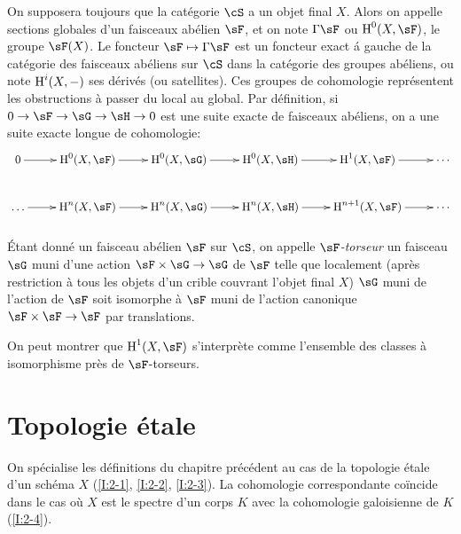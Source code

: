 On supposera toujours que la catégorie $\cS$ a un objet final $X$. Alors on 
appelle sections globales d'un faisceaux abélien $\sF$, et on note 
$\Gamma\sF$ ou $\h^0(X,\sF)$, le groupe $\sF(X)$. Le foncteur 
$\sF\mapsto\Gamma\sF$ est un foncteur exact \'a gauche de la catégorie des 
faisceaux abéliens sur $\cS$ dans la catégorie des groupes abéliens, ou 
note $\operatorname{H}^i(X,-)$ ses dérivés (ou satellites). Ces groupes de cohomologie 
représentent les obstructions à passer du local au global. Par définition, si 
$0\to\sF\to\sG\to\sH\to 0$ est une suite exacte de faisceaux abéliens, on a une 
suite exacte longue de cohomologie:
\[\xymatrix{
  0 \ar[r] 
    & \h^0(X,\sF) \ar[r] 
    & \h^0(X,\sG) \ar[r] 
    & \h^0(X,\sH) \ar[r] 
    & \h^1(X,\sF) \ar[r] 
    & \cdots \\
  \ldots \ar[r] 
    & \h^n(X,\sF) \ar[r] 
    & \h^n(X,\sG) \ar[r]
    & \h^n(X,\sH) \ar[r] 
    & \h^{n+1}(X,\sF) \ar[r] 
    & \cdots
}\]





\subsubsection{}\label{I:1-6-6}

Étant donné un faisceau abélien $\sF$ sur $\cS$, on appelle 
\emph{$\sF$-torseur} un faisceau $\sG$ muni d'une action $\sF\times\sG\to\sG$ 
de $\sF$ telle que localement (après restriction à tous les objets d'un 
crible couvrant l'objet final $X$) $\sG$ muni de l'action de $\sF$ soit 
isomorphe à $\sF$ muni de l'action canonique $\sF\times \sF\to \sF$ par 
translations. 

On peut montrer que $\h^1(X,\sF)$ s'interprète comme l'ensemble des classes 
à isomorphisme près de $\sF$-torseurs. 




















\section{Topologie étale}\label{I:2}

On spécialise les définitions du chapitre précédent au cas de la 
topologie étale d'un schéma $X$ (\ref{I:2-1}, \ref{I:2-2}, \ref{I:2-3}). La 
cohomologie correspondante coïncide dans le cas où $X$ est le spectre d'un 
corps $K$ avec la cohomologie galoisienne de $K$ (\ref{I:2-4}). 











